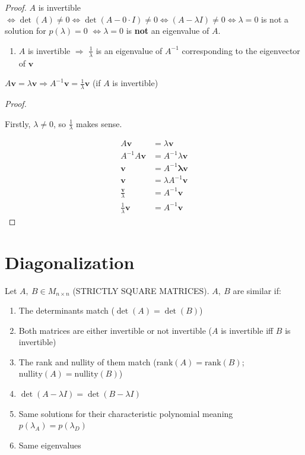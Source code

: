 \documentclass[12pt]{article}
\theoremstyle{plain}
\theoremstyle{remark}
\theoremstyle{definition}
\begin{document}
\begin{proof} \(A\) is invertible
\(\Leftrightarrow \det(A) \neq 0 \Leftrightarrow \det(A - 0 \cdot I) \neq 0 \Leftrightarrow (A - \lambda I) \neq 0 \Leftrightarrow \lambda = 0\)
is not a solution for \(p(\lambda) = 0\) \(\Leftrightarrow \lambda = 0\)
is \textbf{not} an eigenvalue of \(A\).

\begin{enumerate}
\def\labelenumi{\arabic{enumi}.}
\setcounter{enumi}{2}
\item
  \(A\) is invertible \(\Rightarrow\) \(\frac{1}{\lambda}\) is an
  eigenvalue of \(A^{- 1}\) corresponding to the eigenvector of
  \(\mathbf{v}\)
\end{enumerate}

\(A\mathbf{v} = \lambda\mathbf{v} \Rightarrow A^{- 1}\mathbf{v} = \frac{1}{\lambda}\mathbf{v}\)
(if \(A\) is invertible)

\emph{Proof.}

Firstly, \(\lambda \neq 0\), so \(\frac{1}{\lambda}\) makes sense.

\begin{align*}
A\mathbf{v} &= \lambda\mathbf{v} \\
A^{- 1}A\mathbf{v} &= A^{- 1}\lambda\mathbf{v} \\
\mathbf{v} &= A^{- 1}\mathbf{\lambda}\mathbf{v} \\
\mathbf{v} &= \lambda A^{- 1}\mathbf{v} \\
\frac{\mathbf{v}}{\lambda} &= A^{- 1}\mathbf{v} \\
\frac{1}{\lambda}\mathbf{v} &= A^{- 1}\mathbf{v}
\end{align*}




\end{proof}
\section{Diagonalization}

Let \(A,\ B \in M_{n \times n}\) (STRICTLY SQUARE MATRICES). \(A,\ B\)
are similar if:

\begin{enumerate}
\def\labelenumi{\arabic{enumi}.}
\item
  The determinants match (\(\det(A) = \det(B)\))
\item
  Both matrices are either invertible or not invertible (\(A\) is
  invertible iff \(B\) is invertible)
\item
  The rank and nullity of them match
  (\(\text{rank}(A) = \text{rank}(B)\);
  \(\text{nullity}(A) = \text{nullity}(B)\))
\item
  \(\det\left( A - \lambda I \right) = \det\left( B - \lambda I \right)\)
\item
  Same solutions for their characteristic polynomial meaning
  \(p\left( \lambda_{A} \right) = p\left( \lambda_{D} \right)\)
\item
  Same eigenvalues
\end{enumerate}
\end{document}
